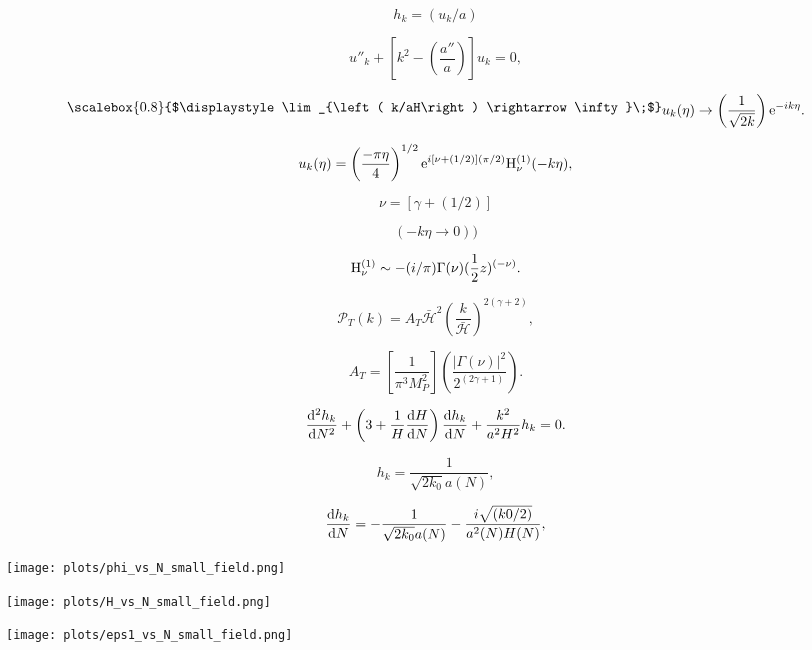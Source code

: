 \documentclass[xcolor=dvipsnames]{beamer}
\newcommand{\Lim}[1]{\raisebox{0.5ex}{\scalebox{0.8}{$\displaystyle \lim_{#1}\;$}}}
\begin{document}
\begin{frame}

\[ h_k = \left(u_k/a\right) \]

\[ u''_k + \left[k^2 - \left(\frac{a''}{a}\right)\right]u_k = 0, \]

\end{frame}

\begin{frame}

\[ \Lim{\left( k/aH\right) \rightarrow \infty} u_k(\eta) \rightarrow \left(\frac{1}{\sqrt{2k}}\right){\rm e}^{-ik\eta}. \]

\[ u_k(\eta) = \left(\frac{-\pi\eta}{4}\right)^{1/2}{\rm e}^{i[\nu+(1/2)](\pi/2)}{\rm H}_{\nu}^{(1)}(-k\eta), \]

\[ \nu = [\gamma + (1/2)] \]

\[ (-k\eta \rightarrow 0)) \]

\[ {\rm H}_{\nu}^{(1)} \sim -(i/\pi)\Gamma(\nu)(\frac{1}{2}z)^{(-\nu)}. \]

\[ \mathcal{P}_T(k) = A_T\bar{\mathcal{H}}^2\left(\frac{k}{\mathcal{\bar{H}}}\right)^{2(\gamma+2)}, \]

\[ A_T = \left[\frac{1}{\pi^3M_P^2}\right]\left(\frac{|\Gamma(\nu)|^2}{2^{(2\gamma+1)}}\right). \]

\end{frame}

\begin{frame}

\[  \frac{{\rm d}^2h_k}{{\rm d}N^2} +\left (3+\frac{1}{H}\frac{{\rm d}H}{{\rm d}N}\right)\frac{{\rm d}h_k}{{\rm d}N} + \frac{k^2}{a^2H^2}h_k = 0. \]

\[ h_k  = \frac{1}{\sqrt{2k_0}a(N)}, \] 

\[ \frac{{\rm d}h_k}{{\rm d}N} = -\frac{1}{\sqrt{2k_0}a(N)} - \frac{i\sqrt{(k0/2)}}{a^2(N)H(N)}, \] 

\end{frame}

\begin{frame}
\texttt{[image: plots/phi\_vs\_N\_small\_field.png]}
\end{frame}

\begin{frame}
\texttt{[image: plots/H\_vs\_N\_small\_field.png]}
\end{frame}

\begin{frame}
\texttt{[image: plots/eps1\_vs\_N\_small\_field.png]}
\end{frame}
\end{document}
